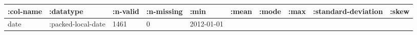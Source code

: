\documentclass[]{article}
\begin{document}
\begin{longtable}[]{@{}llllllllll@{}}
\toprule
\begin{minipage}[b]{0.08\columnwidth}\raggedright\strut
:col-name\strut
\end{minipage} & \begin{minipage}[b]{0.11\columnwidth}\raggedright\strut
:datatype\strut
\end{minipage} & \begin{minipage}[b]{0.06\columnwidth}\raggedright\strut
:n-valid\strut
\end{minipage} & \begin{minipage}[b]{0.07\columnwidth}\raggedright\strut
:n-missing\strut
\end{minipage} & \begin{minipage}[b]{0.07\columnwidth}\raggedright\strut
:min\strut
\end{minipage} & \begin{minipage}[b]{0.07\columnwidth}\raggedright\strut
:mean\strut
\end{minipage} & \begin{minipage}[b]{0.04\columnwidth}\raggedright\strut
:mode\strut
\end{minipage} & \begin{minipage}[b]{0.07\columnwidth}\raggedright\strut
:max\strut
\end{minipage} & \begin{minipage}[b]{0.12\columnwidth}\raggedright\strut
:standard-deviation\strut
\end{minipage} & \begin{minipage}[b]{0.05\columnwidth}\raggedright\strut
:skew\strut
\end{minipage}\tabularnewline
\midrule
\endhead
\begin{minipage}[t]{0.08\columnwidth}\raggedright\strut
date\strut
\end{minipage} & \begin{minipage}[t]{0.11\columnwidth}\raggedright\strut
:packed-local-date\strut
\end{minipage} & \begin{minipage}[t]{0.06\columnwidth}\raggedright\strut
1461\strut
\end{minipage} & \begin{minipage}[t]{0.07\columnwidth}\raggedright\strut
0\strut
\end{minipage} & \begin{minipage}[t]{0.07\columnwidth}\raggedright\strut
2012-01-01\strut
\end{minipage} & \begin{minipage}[t]{0.07\columnwidth}\raggedright\strut

\end{minipage}
\end{longtable}
\end{document}
